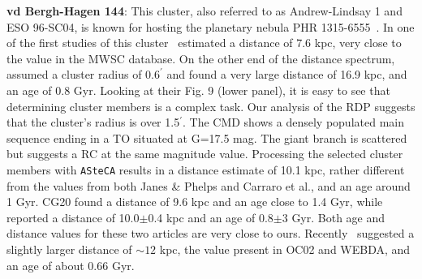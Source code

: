 \documentclass{aa}
\begin{document}
\begin{appendix}
  \noindent \textbf{vd Bergh-Hagen 144}: This cluster, also referred to as Andrew-Lindsay
  1 and ESO 96-SC04, is known for hosting the planetary nebula PHR
  1315-6555~\citep{Parker_2011}.
  In one of the first studies of this cluster~\cite{Janes_1994} estimated a
  distance of 7.6 kpc, very close to the value in the MWSC database. On the
  other end of the distance spectrum,
  \cite{Carraro_2005_neglected} assumed a cluster radius of $0.6^{\prime}$ and
  found a very large distance of 16.9 kpc, and an age of 0.8 Gyr. Looking at
  their Fig. 9 (lower panel), it is easy to see that determining cluster members
  is a complex task. Our analysis of the RDP suggests that the cluster's radius
  is over 1.5$^{\prime}$. The CMD shows a densely populated main sequence ending
  in a TO situated at G=17.5 mag. The giant branch is scattered but suggests a
  RC at the same magnitude value.
  Processing the selected cluster members with \texttt{ASteCA} results in a
  distance estimate of 10.1 kpc, rather different from the values
  from both Janes \& Phelps and Carraro et al., and an age around 1 Gyr.
  CG20 found a distance of 9.6 kpc and an age close to 1.4 Gyr,
  while~\cite{Majaess_2014} reported a distance of 10.0$\pm$0.4 kpc and an
  age of 0.8$\pm$3 Gyr. Both age and distance values for these two articles are
  very close to ours. Recently~\cite{Fragkou_2019} suggested a slightly larger
  distance of $\sim12$ kpc, the value present in OC02 and WEBDA, and an age of
  about 0.66 Gyr.\\


\end{appendix}
\end{document}
